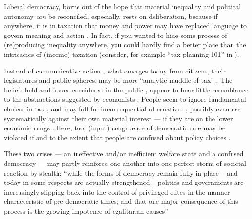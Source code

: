 

Liberal democracy, borne out of the hope that material inequality and political autonomy \emph{can} be reconciled, %
especially, rests on deliberation, because if anywhere, it is in taxation that money and power may have replaced language to govern meaning and action \cite{Habermas-1971}.
In fact, if you wanted to hide some process of (re)producing inequality anywhere, you could hardly find a better place than the intricacies of (income) taxation (consider, for example ``tax planning 101'' in \citealt[888]{McCaffery2005}). 

Instead of communicative action \citep{Habermas-1984-aa}, what emerges today from citizens, their legislatures and public spheres, may be more ``analytic muddle of tax'' \citep[862]{McCaffery2005}.
The beliefs held and issues considered in the public \citep[for example,][]{Caplan2007}, appear to bear little resemblance to the abstractions suggested by economists \cite[for example,][]{Harberger1974}.
People seem to ignore fundamental choices in tax \citep[for example,][]{McCafferyHines2010}, and may fall for inconsequential alternatives \citep[for example,][]{SausgruberTyran2011}, possibly even err systematically against their own material interest --- if they are on the lower economic rungs \citep[for a German example,][]{Kemmerling2009}.
Here, too, (input) congruence of democratic rule may be violated if and to the extent that people are confused about policy choices \citep[190][compare]{Zurn-2000-aa}.

These two crises --- an ineffective and/or inefficient welfare state and a confused democracy --- may partly reinforce one another into one perfect storm of societal reaction by stealth: 
``while the forms of democracy remain fully in place -- and today in some respects are actually strengthened -- politics and governments are increasingly slipping back into the control of privileged elites in the manner characteristic of pre-democratic times; and that one major consequence of this process is the growing impotence of egalitarian causes'' \citep[6]{Crouch2004}


